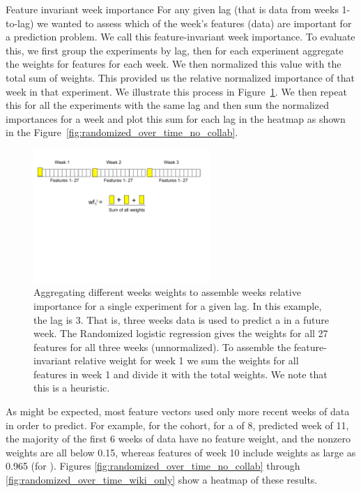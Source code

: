 \begin{paragraph}
{Feature invariant week importance} For any given lag (that is data from weeks 1-to-lag) we wanted to assess which of the week's features (data) are important for a prediction problem. We call this feature-invariant week importance. To evaluate this, we first group the experiments by lag, then for each experiment aggregate the weights for features for each week. We then normalized this value with the total sum of weights. This provided us the relative normalized importance of that week in that experiment. We illustrate this process in Figure~\ref{fig:fiw}. We then repeat this for all the experiments with the same lag and then sum the normalized importances for a week and plot this sum for each lag in the heatmap as shown in the Figure~\ref{fig:randomized_over_time_no_collab}. 

\begin{figure}[ht!]
  \caption{Aggregating different weeks weights to assemble weeks relative importance for a single experiment for a given lag. In this example, the lag is 3. That is,  three weeks data is used to predict a \sti in a future week. The Randomized logistic regression gives the weights for all 27 features for all three weeks (unnormalized). To assemble the feature-invariant relative weight for week 1 we sum the weights for all features in week 1 and divide it with the total weights. We note that this is a heuristic. }\label{fig:fiw}
  \centering
    \includegraphics[width=0.6\textwidth]{figures/wif}
\end{figure}


As might be expected, most feature vectors used only more recent weeks of data in order to predict. For example, for the \neither cohort, for a \lag of 8, predicted week of 11, the majority of the first 6 weeks of data have no feature weight, and the nonzero weights are all below 0.15, whereas features of week 10 include weights as large as 0.965 (for ). Figures \ref{fig:randomized_over_time_no_collab} through \ref{fig:randomized_over_time_wiki_only} show a heatmap of these results.


\end{paragraph}
